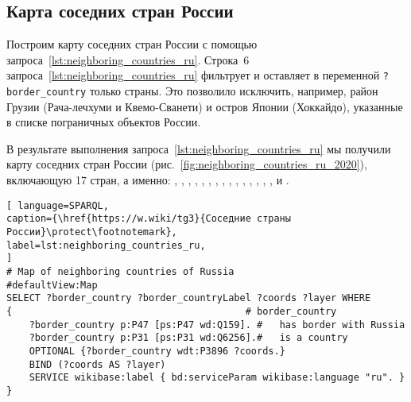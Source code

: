 \begin{marginfigure}
	{
		\setlength{\fboxsep}{0pt}%
		\setlength{\fboxrule}{1pt}%
	}
    \caption[Фрагмент графа соседних стран, 2020 год.]{Фрагмент графа соседних стран, в центре Россия, 2020 год.}
	\label{fig:neighboring_countries_2020}%
\end{marginfigure}



\newpage
\subsection{Карта соседних стран России}
%
\begin{marginfigure}[2\baselineskip]
	{
		\setlength{\fboxsep}{0pt}%
		\setlength{\fboxrule}{1pt}%
	}
    \caption[Карта соседних стран России, 2021 год.]{Карта соседних стран России, включающая 17~стран, 2021 год.}
	\label{fig:neighboring_countries_ru_2020}%
\end{marginfigure}


Построим карту соседних стран России с помощью запроса~\ref{lst:neighboring_countries_ru}.
Строка~6 запроса~\ref{lst:neighboring_countries_ru} 
фильтрует и оставляет в переменной \lstinline|?border_country| только страны.
Это позволило исключить, например, район Грузии (Рача-лечхуми и Квемо-Сванети) 
и остров Японии (Хоккайдо), указанные в списке пограничных объектов России.

В результате выполнения запроса~\ref{lst:neighboring_countries_ru} мы получили 
карту соседних стран России 
(рис.~\ref{fig:neighboring_countries_ru_2020}), включающую 17 стран, а именно: 
, , , , , , , , , , , , , , ,  и .


\begin{lstlisting}[ language=SPARQL, 
caption={\href{https://w.wiki/tg3}{Соседние страны России}\protect\footnotemark},
label=lst:neighboring_countries_ru, 
]
# Map of neighboring countries of Russia
#defaultView:Map
SELECT ?border_country ?border_countryLabel ?coords ?layer WHERE 
{                                         # border_country
	?border_country p:P47 [ps:P47 wd:Q159]. #   has border with Russia
	?border_country p:P31 [ps:P31 wd:Q6256].#   is a country
	OPTIONAL {?border_country wdt:P3896 ?coords.}
	BIND (?coords AS ?layer)
	SERVICE wikibase:label { bd:serviceParam wikibase:language "ru". }
}
\end{lstlisting}


